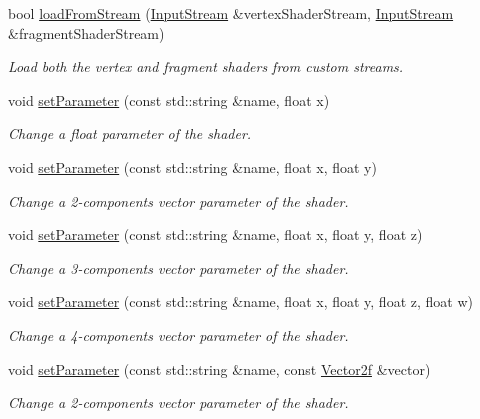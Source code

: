 \begin{DoxyCompactItemize}
bool \hyperlink{classsf_1_1_shader_a3b7958159ffb5596c4babc3052e35465}{load\+From\+Stream} (\hyperlink{classsf_1_1_input_stream}{Input\+Stream} \&vertex\+Shader\+Stream, \hyperlink{classsf_1_1_input_stream}{Input\+Stream} \&fragment\+Shader\+Stream)
\begin{DoxyCompactList}\small\item\em Load both the vertex and fragment shaders from custom streams. \end{DoxyCompactList}\item 
void \hyperlink{classsf_1_1_shader_a47e4dd78f0752ae08664b4ee616db1cf}{set\+Parameter} (const std\+::string \&name, float x)
\begin{DoxyCompactList}\small\item\em Change a float parameter of the shader. \end{DoxyCompactList}\item 
void \hyperlink{classsf_1_1_shader_ab8d379f40810b8e3eadebee81aedd231}{set\+Parameter} (const std\+::string \&name, float x, float y)
\begin{DoxyCompactList}\small\item\em Change a 2-\/components vector parameter of the shader. \end{DoxyCompactList}\item 
void \hyperlink{classsf_1_1_shader_a7e36e044d6b8adca8339f40c5a4b1801}{set\+Parameter} (const std\+::string \&name, float x, float y, float z)
\begin{DoxyCompactList}\small\item\em Change a 3-\/components vector parameter of the shader. \end{DoxyCompactList}\item 
void \hyperlink{classsf_1_1_shader_aeb468f1bc2d26750b96b74f1e19027fb}{set\+Parameter} (const std\+::string \&name, float x, float y, float z, float w)
\begin{DoxyCompactList}\small\item\em Change a 4-\/components vector parameter of the shader. \end{DoxyCompactList}\item 
void \hyperlink{classsf_1_1_shader_a3ac473ece2c6fa26dc5032c07fd7288e}{set\+Parameter} (const std\+::string \&name, const \hyperlink{classsf_1_1_vector2}{Vector2f} \&vector)
\begin{DoxyCompactList}\small\item\em Change a 2-\/components vector parameter of the shader. \end{DoxyCompactList}\item 

\end{DoxyCompactItemize}

